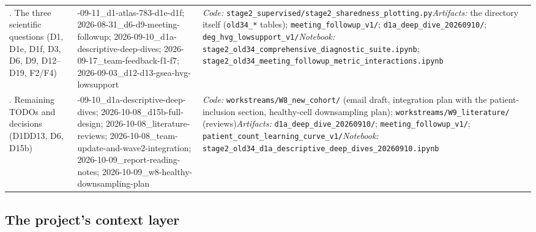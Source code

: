 {\begin{longtable}{>{\raggedright\arraybackslash}p{2.6cm} >{\raggedright\arraybackslash}p{4.0cm} >{\raggedright\arraybackslash}p{8.4cm}}
\addlinespace
8. The three scientific questions (D1, D1e, D1f, D3, D6, D9, D12--D19, F2/F4) & 2026-09-11\_d1-atlas-783-d1e-d1f; 2026-08-31\_d6-d9-meeting-followup; 2026-09-10\_d1a-descriptive-deep-dives; 2026-09-17\_team-feedback-f1-f7; 2026-09-03\_d12-d13-gsea-hvg-lowsupport & \emph{Code:} \nolinkurl{stage2_supervised/stage2_sharedness_plotting.py}\newline \emph{Artifacts:} the directory itself (\nolinkurl{old34_*} tables); \nolinkurl{meeting_followup_v1/}; \nolinkurl{d1a_deep_dive_20260910/}; \nolinkurl{deg_hvg_lowsupport_v1/}\newline \emph{Notebook:} \nolinkurl{stage2_old34_comprehensive_diagnostic_suite.ipynb}; \nolinkurl{stage2_old34_meeting_followup_metric_interactions.ipynb} \\
\addlinespace
9. Remaining TODOs and decisions (D1DD13, D6, D15b) & 2026-09-10\_d1a-descriptive-deep-dives; 2026-10-08\_d15b-full-design; 2026-10-08\_literature-reviews; 2026-10-08\_team-update-and-wave2-integration; 2026-10-09\_report-reading-notes; 2026-10-09\_w8-healthy-downsampling-plan & \emph{Code:} \nolinkurl{workstreams/W8_new_cohort/} (email draft, integration plan with the patient-inclusion section, healthy-cell downsampling plan); \nolinkurl{workstreams/W9_literature/} (reviews)\newline \emph{Artifacts:} \nolinkurl{d1a_deep_dive_20260910/}; \nolinkurl{meeting_followup_v1/}; \nolinkurl{patient_count_learning_curve_v1/}\newline \emph{Notebook:} \nolinkurl{stage2_old34_d1a_descriptive_deep_dives_20260910.ipynb} \\
\end{longtable}
}

\subsection*{The project's context layer}

